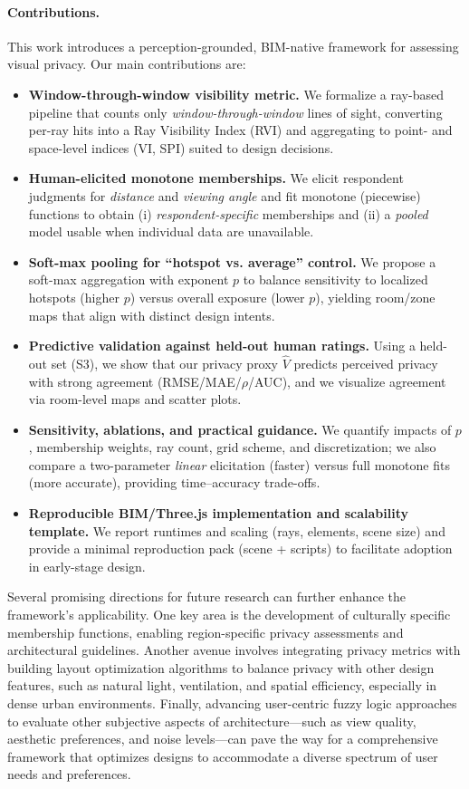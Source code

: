 \documentclass[final,3p,times,review]{elsarticle}
\begin{document}
\paragraph{Contributions.}
This work introduces a perception-grounded, BIM-native framework for assessing visual privacy. Our main contributions are:
\begin{itemize}
  \item \textbf{Window-through-window visibility metric.} We formalize a ray-based pipeline that counts only \emph{window-through-window} lines of sight, converting per-ray hits into a Ray Visibility Index (RVI) and aggregating to point- and space-level indices (VI, SPI) suited to design decisions.
  \item \textbf{Human-elicited monotone memberships.} We elicit respondent judgments for \emph{distance} and \emph{viewing angle} and fit monotone (piecewise) functions to obtain (i) \emph{respondent-specific} memberships and (ii) a \emph{pooled} model usable when individual data are unavailable.
  \item \textbf{Soft-max pooling for “hotspot vs. average” control.} We propose a soft-max aggregation with exponent $p$ to balance sensitivity to localized hotspots (higher $p$) versus overall exposure (lower $p$), yielding room/zone maps that align with distinct design intents.
  \item \textbf{Predictive validation against held-out human ratings.} Using a held-out set (S3), we show that our privacy proxy $\widehat{V}$ predicts perceived privacy with strong agreement (RMSE/MAE/$\rho$/AUC), and we visualize agreement via room-level maps and scatter plots.
  \item \textbf{Sensitivity, ablations, and practical guidance.} We quantify impacts of $p$, membership weights, ray count, grid scheme, and discretization; we also compare a two-parameter \emph{linear} elicitation (faster) versus full monotone fits (more accurate), providing time–accuracy trade-offs.
  \item \textbf{Reproducible BIM/Three.js implementation and scalability template.} We report runtimes and scaling (rays, elements, scene size) and provide a minimal reproduction pack (scene + scripts) to facilitate adoption in early-stage design.
\end{itemize}


Several promising directions for future research can further enhance the framework's applicability. One key area is the development of culturally specific membership functions, enabling region-specific privacy assessments and architectural guidelines. Another avenue involves integrating privacy metrics with building layout optimization algorithms to balance privacy with other design features, such as natural light, ventilation, and spatial efficiency, especially in dense urban environments. Finally, advancing user-centric fuzzy logic approaches to evaluate other subjective aspects of architecture---such as view quality, aesthetic preferences, and noise levels---can pave the way for a comprehensive framework that optimizes designs to accommodate a diverse spectrum of user needs and preferences.
\end{document}
